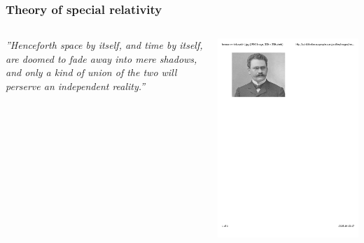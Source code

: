 \documentclass[mathserif,8pt]{beamer}
\begin{document}
\begin{frame}
    \frametitle{Theory of special relativity}
    \begin{columns}
    \begin{column}{.60\textwidth}
	\centering
	\begin{exampleblock}{\it{\small{''Henceforth space by itself, and time by itself,
	    are doomed to fade away into mere shadows, and only a kind of union of the
	    two will perserve an independent reality.''}}}
	    \vskip2mm
	    \hspace*{}
	\end{exampleblock}
    \end{column}
    \begin{column}{.40\textwidth}
	\centering
	\includegraphics[viewport = 70 600 270 780, clip, scale=0.4]{figures/minkowski.pdf}
    \end{column}
    \end{columns}

\end{frame}
\end{document}
